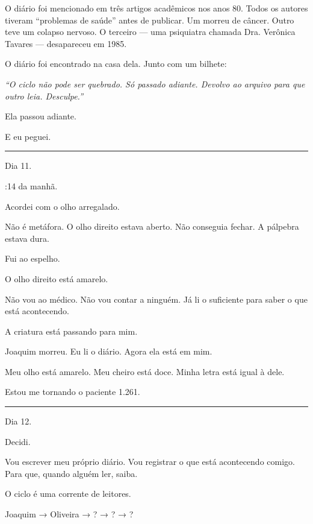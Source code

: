 \noindent O diário foi mencionado em três artigos acadêmicos nos anos 80. Todos os autores tiveram \textquotedblleft{}problemas de saúde\textquotedblright{} antes de publicar. Um morreu de câncer. Outro teve um colapso nervoso. O terceiro --- uma psiquiatra chamada Dra. Verônica Tavares --- desapareceu em 1985.

\noindent O diário foi encontrado na casa dela. Junto com um bilhete:

\noindent \textit{\textquotedblleft{}O ciclo não pode ser quebrado. Só passado adiante. Devolvo ao arquivo para que outro leia. Desculpe.\textquotedblright{}}

\noindent Ela passou adiante.

\noindent E eu peguei.

\vspace{0.5em}\noindent\rule{\textwidth}{0.5pt}\vspace{0.5em}

\noindent Dia 11.

:14 da manhã.

\noindent Acordei com o olho arregalado.

\noindent Não é metáfora. O olho direito estava aberto. Não conseguia fechar. A pálpebra estava dura.

\noindent Fui ao espelho.

\noindent O olho direito está amarelo.

\noindent Não vou ao médico. Não vou contar a ninguém. Já li o suficiente para saber o que está acontecendo.

\noindent A criatura está passando para mim.

\noindent Joaquim morreu.
Eu li o diário.
Agora ela está em mim.

\noindent Meu olho está amarelo.
Meu cheiro está doce.
Minha letra está igual à dele.

\noindent Estou me tornando o paciente 1.261.

\vspace{0.5em}\noindent\rule{\textwidth}{0.5pt}\vspace{0.5em}

\noindent Dia 12.

\noindent Decidi.

\noindent Vou escrever meu próprio diário. Vou registrar o que está acontecendo comigo. Para que, quando alguém ler, saiba.

\noindent O ciclo é uma corrente de leitores.

\noindent Joaquim → Oliveira → ? → ? → ?

